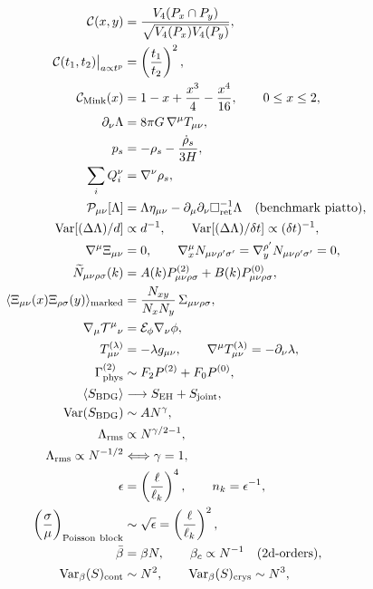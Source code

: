 \documentclass[11pt,a4paper]{article}
\begin{document}
\begin{align}
\mathcal C(x,y)&=\frac{V_4(P_x\cap P_y)}{\sqrt{V_4(P_x)V_4(P_y)}},\\
\mathcal C(t_1,t_2)\big|_{a\propto t^p}&=\left(\frac{t_1}{t_2}\right)^2,\\
\mathcal C_{\rm Mink}(x)&=1-x+\frac{x^3}{4}-\frac{x^4}{16},\qquad 0\le x\le2,\\
\partial_\nu\Lambda&=8\pi G\,\nabla^\mu T_{\mu\nu},\\
p_s&=-\rho_s-\frac{\dot\rho_s}{3H},\\
\sum_i Q_i^\nu&=\nabla^\nu\rho_s,\\
\mathcal P_{\mu\nu}[\Lambda]&=\Lambda\eta_{\mu\nu}-\partial_\mu\partial_\nu\Box_{\rm ret}^{-1}\Lambda\quad(\text{benchmark piatto}),\\
\mathrm{Var}[(\Delta\Lambda)/d]&\propto d^{-1},\qquad
\mathrm{Var}[(\Delta\Lambda)/\delta t]\propto(\delta t)^{-1},\\
\nabla^\mu\Xi_{\mu\nu}&=0,\qquad
\nabla_x^\mu N_{\mu\nu\rho'\sigma'}=\nabla_y^{\rho'}N_{\mu\nu\rho'\sigma'}=0,\\
\widetilde N_{\mu\nu\rho\sigma}(k)&=A(k)P^{(2)}_{\mu\nu\rho\sigma}+B(k)P^{(0)}_{\mu\nu\rho\sigma},\\
\langle\Xi_{\mu\nu}(x)\Xi_{\rho\sigma}(y)\rangle_{\rm marked}&=\frac{N_{xy}}{N_xN_y}\,\Sigma_{\mu\nu\rho\sigma},\\
\nabla_\mu\mathcal T^{\mu}{}_{\nu}&=\mathcal E_\phi\nabla_\nu\phi,\\
T^{(\lambda)}_{\mu\nu}&=-\lambda g_{\mu\nu},\qquad \nabla^\mu T^{(\lambda)}_{\mu\nu}=-\partial_\nu\lambda,\\
\Gamma_{\rm phys}^{(2)}&\sim F_2P^{(2)}+F_0P^{(0)},\\
\langle S_{\rm BDG}\rangle&\longrightarrow S_{\rm EH}+S_{\rm joint},\\
\mathrm{Var}(S_{\rm BDG})&\sim A N^\gamma,\\
\Lambda_{\rm rms}&\propto N^{\gamma/2-1},\\
\Lambda_{\rm rms}\propto N^{-1/2}&\Longleftrightarrow \gamma=1,\\
\epsilon&=\left(\frac{\ell}{\ell_k}\right)^4,\qquad n_k=\epsilon^{-1},\\
\left(\frac{\sigma}{\mu}\right)_{\rm Poisson\ block}&\sim \sqrt{\epsilon}=\left(\frac{\ell}{\ell_k}\right)^2,\\
\bar\beta&=\beta N,\qquad \beta_c\propto N^{-1}\quad(\text{2d-orders}),\\
\mathrm{Var}_{\beta}(S)_{\rm cont}&\sim N^2,\qquad
\mathrm{Var}_{\beta}(S)_{\rm crys}\sim N^3,\qquad

\end{align}
\end{document}
